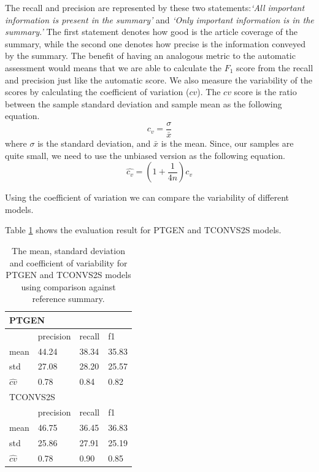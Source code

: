 \documentclass[11pt,a4paper]{article}
\begin{document}
The recall and precision are represented by these two statements:\textit{`All important information is present in the summary'} and \textit{`Only important information is in the summary.'} The first statement denotes how good is the article coverage of the summary, while the second one denotes how precise is the information conveyed by the summary. The benefit of having an analogous metric to the automatic assessment would means that we are able to calculate the $F_1$ score from the recall and precision just like the automatic score. We also measure the variability of the scores by calculating the coefficient of variation ($cv$). The $cv$ score is the ratio between the sample standard deviation and sample mean as the following equation.
\begin{equation}
  c_v = \frac{\sigma}{\bar{x}}
\end{equation}
where $\sigma$ is the standard deviation, and $\bar{x}$ is the mean. Since, our samples are quite small, we need to use the unbiased version as the following equation.
\begin{equation}
  \hat{c_v} = (1 + \frac{1}{4n})c_v
\end{equation}

Using the coefficient of variation we can compare the variability of different models.

Table \ref{table:refsummresult} shows the evaluation result for PTGEN and TCONVS2S models.

\begin{table}[]
  \small
  \begin{tabular}{llll}
  \hline
  \multicolumn{4}{l}{PTGEN}                                          \\
  \hline
            & precision        & recall           & f1               \\
  mean      & 44.24            & 38.34            & 35.83        \\
  std       & 27.08        & 28.20        & 25.57        \\
  $\hat{cv}$        & 0.78         & 0.84         & 0.82         \\
  \hline
  \multicolumn{4}{l}{TCONVS2S}                                       \\
  \hline
  & precision & recall           & f1                                 \\
  mean      & 46.75 & 36.45 & 36.83 \\
  std       & 25.86        & 27.91        & 25.19        \\
  $\hat{cv}$        & 0.78         & 0.90         & 0.85        
  \end{tabular}
\caption{The mean, standard deviation and coefficient of variability for PTGEN and TCONVS2S models using comparison against reference summary.}
\label{table:refsummresult}
\end{table}
\end{document}
